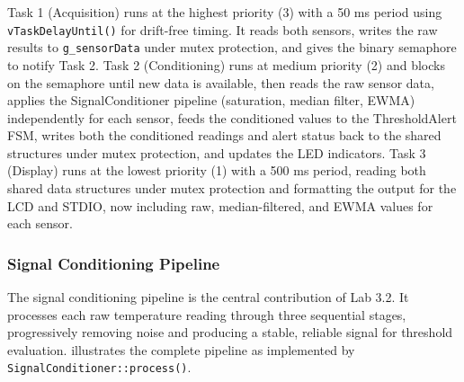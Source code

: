 Task 1 (Acquisition) runs at the highest priority (3) with a 50 ms period using \texttt{vTaskDelayUntil()} for drift-free timing. It reads both sensors, writes the raw results to \texttt{g\_sensorData} under mutex protection, and gives the binary semaphore to notify Task 2. Task 2 (Conditioning) runs at medium priority (2) and blocks on the semaphore until new data is available, then reads the raw sensor data, applies the SignalConditioner pipeline (saturation, median filter, EWMA) independently for each sensor, feeds the conditioned values to the ThresholdAlert FSM, writes both the conditioned readings and alert status back to the shared structures under mutex protection, and updates the LED indicators. Task 3 (Display) runs at the lowest priority (1) with a 500 ms period, reading both shared data structures under mutex protection and formatting the output for the LCD and STDIO, now including raw, median-filtered, and EWMA values for each sensor.

\subsubsection{Signal Conditioning Pipeline}

The signal conditioning pipeline is the central contribution of Lab 3.2. It processes each raw temperature reading through three sequential stages, progressively removing noise and producing a stable, reliable signal for threshold evaluation.  illustrates the complete pipeline as implemented by \texttt{SignalConditioner::process()}.


